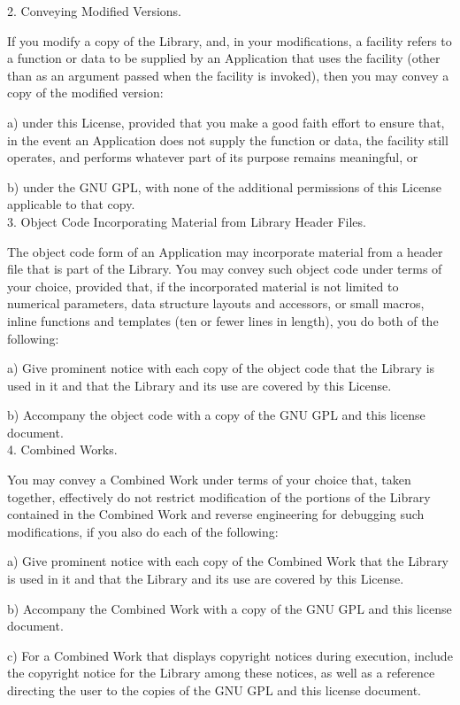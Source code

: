 2. Conveying Modified Versions.

If you modify a copy of the Library, and, in your modifications, a
facility refers to a function or data to be supplied by an Application
that uses the facility (other than as an argument passed when the
facility is invoked), then you may convey a copy of the modified
version:

a) under this License, provided that you make a good faith effort to
ensure that, in the event an Application does not supply the
function or data, the facility still operates, and performs
whatever part of its purpose remains meaningful, or

b) under the GNU GPL, with none of the additional permissions of
this License applicable to that copy. \\

3. Object Code Incorporating Material from Library Header Files.

The object code form of an Application may incorporate material from
a header file that is part of the Library.  You may convey such object
code under terms of your choice, provided that, if the incorporated
material is not limited to numerical parameters, data structure
layouts and accessors, or small macros, inline functions and templates
(ten or fewer lines in length), you do both of the following:

a) Give prominent notice with each copy of the object code that the
Library is used in it and that the Library and its use are
covered by this License.

b) Accompany the object code with a copy of the GNU GPL and this license
document. \\

4. Combined Works.

You may convey a Combined Work under terms of your choice that,
taken together, effectively do not restrict modification of the
portions of the Library contained in the Combined Work and reverse
engineering for debugging such modifications, if you also do each of
the following:

a) Give prominent notice with each copy of the Combined Work that
the Library is used in it and that the Library and its use are
covered by this License.

b) Accompany the Combined Work with a copy of the GNU GPL and this license
document.

c) For a Combined Work that displays copyright notices during
execution, include the copyright notice for the Library among
these notices, as well as a reference directing the user to the
copies of the GNU GPL and this license document.

